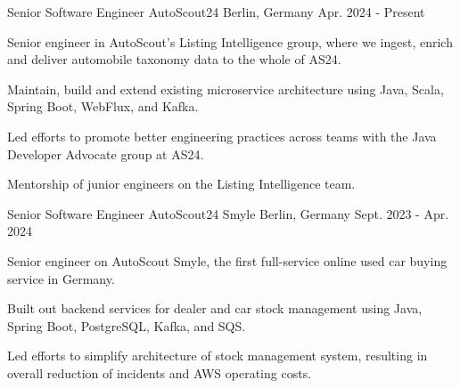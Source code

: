 
\begin{cventries}

  \cventry
    {Senior Software Engineer} %
    {AutoScout24} %
    {Berlin, Germany} %
    {Apr. 2024 - Present} %
    {
      \begin{cvitems} %
        \item {Senior engineer in AutoScout's Listing Intelligence group, where we ingest, enrich and deliver automobile taxonomy data to the whole of AS24.}
        \item {Maintain, build and extend existing microservice architecture using Java, Scala, Spring Boot, WebFlux, and Kafka.}
        \item {Led efforts to promote better engineering practices across teams with the Java Developer Advocate group at AS24.}
        \item {Mentorship of junior engineers on the Listing Intelligence team.}
      \end{cvitems}
    }

  \cventry
  {Senior Software Engineer} %
  {AutoScout24 Smyle} %
  {Berlin, Germany} %
  {Sept. 2023 - Apr. 2024} %
  {
    \begin{cvitems} %
      \item {Senior engineer on AutoScout Smyle, the first full-service online used car buying service in Germany.}
      \item {Built out backend services for dealer and car stock management using Java, Spring Boot, PostgreSQL, Kafka, and SQS.}
      \item {Led efforts to simplify architecture of stock management system, resulting in overall reduction of incidents and AWS operating costs.}
    \end{cvitems}
  }


\end{cventries}
